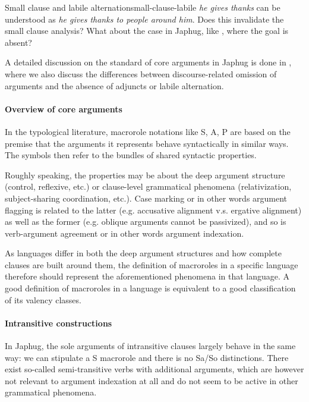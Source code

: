 \documentclass[a4paper, oneside, 12pt]{report}
\newcommand*{\citesec}[1]{\S~{#1}}
\newcommand{\form}[1]{\emph{#1}}
\begin{document}
\begin{todobox}{Small clause and labile alternation}{small-clause-labile}
    \form{he gives thanks} can be understood as
    \form{he gives thanks to people around him}.
    Does this invalidate the small clause analysis?
    What about the case in Japhug,
    like \citep[\citesec{22.1.2.2}, (29)]{jacques2021grammar},
    where the goal is absent?
\end{todobox}

A detailed discussion on the standard of core arguments in Japhug
is done in ,
where we also discuss the differences between discourse-related omission of arguments
and the absence of adjuncts or labile alternation.


\paragraph*{Overview of core arguments}
In the typological literature, macrorole notations like S, A, P 
are based on the premise that the arguments it represents
behave syntactically in similar ways.
The symbols then refer to the bundles of shared syntactic properties.

Roughly speaking, the properties may be about the deep argument structure
(control, reflexive, etc.) or clause-level grammatical phenomena
(relativization, subject-sharing coordination, etc.).
Case marking or in other words argument flagging 
is related to the latter (e.g. accusative alignment v.s. ergative alignment)
as well as the former (e.g. oblique arguments cannot be passivized),
and so is verb-argument agreement or in other words argument indexation.

As languages differ in both the deep argument structures
and how complete clauses are built around them,
the definition of macroroles in a specific language therefore should represent 
the aforementioned phenomena in that language.
A good definition of macroroles in a language
is equivalent to a good classification of its valency classes.

\paragraph*{Intransitive constructions}
In Japhug, the sole arguments of intransitive clauses largely behave in the same way:
we can stipulate a S macrorole and there is no Sa/So distinctions. 
There exist so-called semi-transitive verbs with additional arguments,
which are however not relevant to argument indexation at all
\citep[\citesec{14.2.5}]{jacques2021grammar}
and do not seem to be active in other grammatical phenomena.
\end{document}

